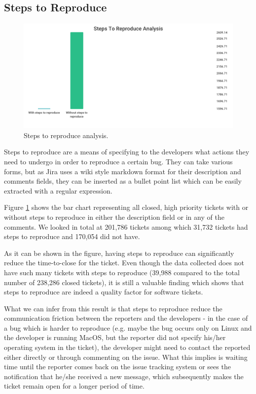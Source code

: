 \documentclass{mpaper}
\begin{document}
\subsection{Steps to Reproduce}

\begin{figure}[ht]
  \begin{center}
    \includegraphics[scale=0.23]{images/steps_to_reproduce.png}
  \end{center}
  \caption{\label{steps}Steps to reproduce analysis.}
\end{figure}

Steps to reproduce are a means of specifying to the developers what actions they need to undergo in order 
to reproduce a certain bug. They can take various forms, but as Jira uses a wiki style markdown format for 
their description and comments fields, they can be inserted as a bullet point list which can be easily 
extracted with a regular expression.

Figure \ref{steps} shows the bar chart representing all closed, high priority tickets with or without steps 
to reproduce in either the description field or in any of the comments. We looked in total at 201,786 tickets 
among which 31,732 tickets had steps to reproduce and 170,054 did not have.

As it can be shown in the figure, having steps to reproduce can significantly reduce the time-to-close 
for the ticket. Even though the data collected does not have such many tickets with steps to reproduce 
(39,988 compared to the total number of 238,286 closed tickets), it is still a valuable finding which shows 
that steps to reproduce are indeed a quality factor for software tickets. 

What we can infer from this result is that steps to reproduce reduce the communication friction between 
the reporters and the developers - in the case of a bug which is harder to reproduce (e.g. maybe the 
bug occurs only on Linux and the developer is running MacOS, but the reporter did not specify his/her 
operating system in the ticket), the developer might need to contact the reported either directly or 
through commenting on the issue. What this implies is waiting time until the reporter comes back on the 
issue tracking system or sees the notification that he/she received a new message, which subsequently makes 
the ticket remain open for a longer period of time. 
\end{document}
